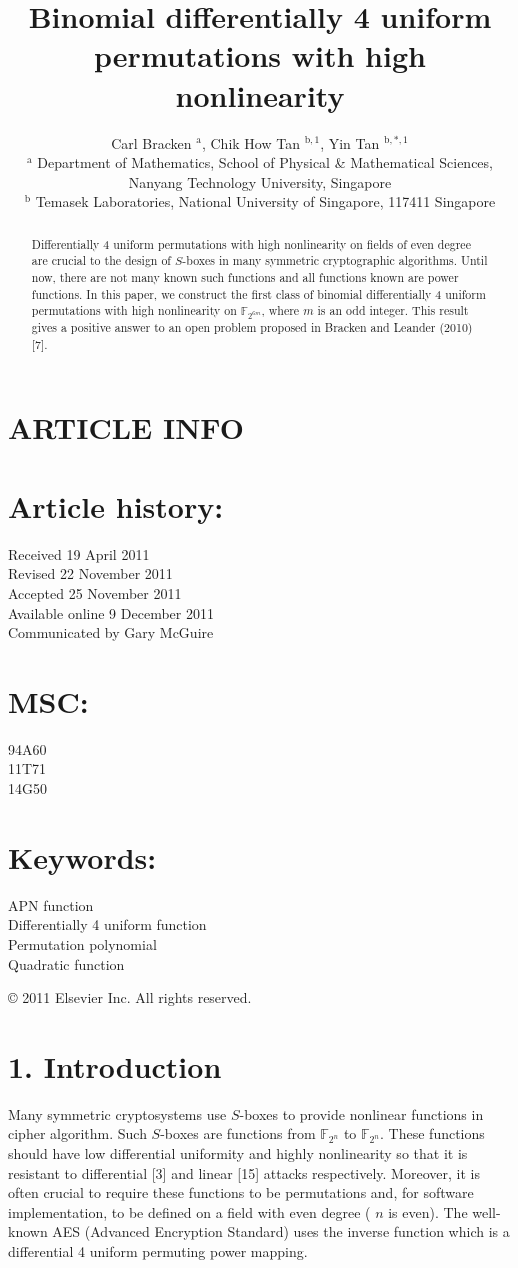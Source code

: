 \documentclass[10pt]{article}
\title{Binomial differentially 4 uniform permutations with high nonlinearity }
\author{Carl Bracken ${ }^{\mathrm{a}}$, Chik How Tan ${ }^{\mathrm{b}, 1}$, Yin Tan ${ }^{\mathrm{b}, *, 1}$\\
${ }^{\mathrm{a}}$ Department of Mathematics, School of Physical \& Mathematical Sciences, Nanyang Technology University, Singapore\\
${ }^{\mathrm{b}}$ Temasek Laboratories, National University of Singapore, 117411 Singapore}
\date{}
\begin{document}
\maketitle
\captionsetup{singlelinecheck=false}


\section*{ARTICLE INFO}
\section*{Article history:}
Received 19 April 2011\\
Revised 22 November 2011\\
Accepted 25 November 2011\\
Available online 9 December 2011\\
Communicated by Gary McGuire

\section*{MSC:}
94A60\\
11T71\\
14G50

\section*{Keywords:}
APN function\\
Differentially 4 uniform function\\
Permutation polynomial\\
Quadratic function

\begin{abstract}
Differentially 4 uniform permutations with high nonlinearity on fields of even degree are crucial to the design of $S$-boxes in many symmetric cryptographic algorithms. Until now, there are not many known such functions and all functions known are power functions. In this paper, we construct the first class of binomial differentially 4 uniform permutations with high nonlinearity on $\mathbb{F}_{2^{6 m}}$, where $m$ is an odd integer. This result gives a positive answer to an open problem proposed in Bracken and Leander (2010) [7].
\end{abstract}

© 2011 Elsevier Inc. All rights reserved.

\section*{1. Introduction}
Many symmetric cryptosystems use $S$-boxes to provide nonlinear functions in cipher algorithm. Such $S$-boxes are functions from $\mathbb{F}_{2^{n}}$ to $\mathbb{F}_{2^{n}}$. These functions should have low differential uniformity and highly nonlinearity so that it is resistant to differential [3] and linear [15] attacks respectively. Moreover, it is often crucial to require these functions to be permutations and, for software implementation, to be defined on a field with even degree ( $n$ is even). The well-known AES (Advanced Encryption Standard) uses the inverse function which is a differential 4 uniform permuting power mapping.
\end{document}
